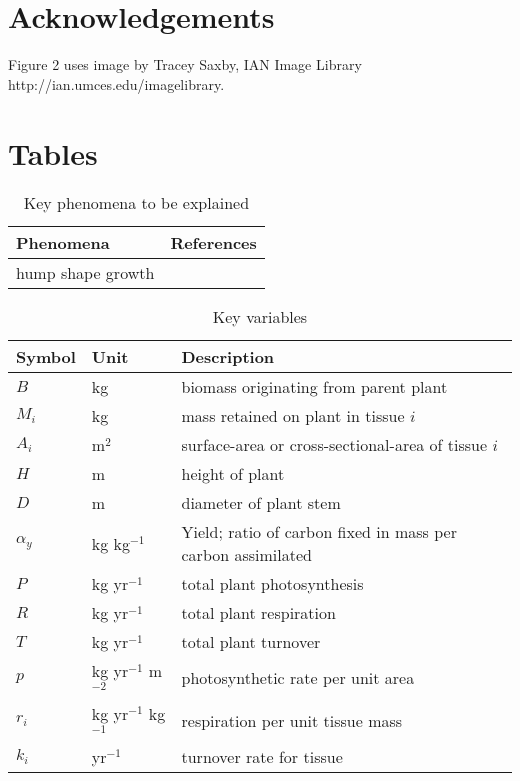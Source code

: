 \documentclass[a4paper,11pt]{article}
\begin{document}
\section{Acknowledgements}

Figure 2 uses image by Tracey Saxby, IAN Image Library http://ian.umces.edu/imagelibrary.

\newpage

\section{Tables}

\begin{table}[ht]
 \caption{Key phenomena to be explained}
\centering

{\footnotesize  %
 \begin{doublespace}
  \begin{tabular}{p{7cm}p{4cm}}
  \hline
  Phenomena & References \\
  \hline
  hump shape growth & \citep{King-2005} \\
  \hline
  \end{tabular}
\end{doublespace}}
\label{tab:phenomena}
\end{table}

\newpage

\begin{table}[ht]
 \caption{Key variables}
\centering

{\footnotesize  %
 \begin{doublespace}
  \begin{tabular}{p{2cm}p{2cm}p{7cm}}
  \hline
  Symbol & Unit & Description \\
  \hline

  $B$   & kg  & biomass originating from parent plant\\
  $M_i$ & kg  & mass retained on plant in tissue $i$\\
  $A_i$ & m$^2$  & surface-area or cross-sectional-area of tissue $i$\\
  $H$   & m  & height of plant\\
  $D$   & m  & diameter of plant stem\\
  $\alpha_y$ & kg kg$^{-1}$ & Yield; ratio of carbon fixed in mass per carbon assimilated \\
  $P$ & kg yr$^{-1}$ & total plant photosynthesis \\
  $R$ & kg yr$^{-1}$ & total plant respiration \\
  $T$ & kg yr$^{-1}$ & total plant turnover \\
  $p$ & kg yr$^{-1}$ m$^{-2}$  & photosynthetic rate per unit area \\
  $r_i$ & kg yr$^{-1}$ kg$^{-1}$  & respiration per unit tissue mass \\
  $k_i$ & yr$^{-1}$ & turnover rate for tissue \\
  \hline
  \end{tabular}
\end{doublespace}}
\label{tab:definitions}
\end{table}
\end{document}

